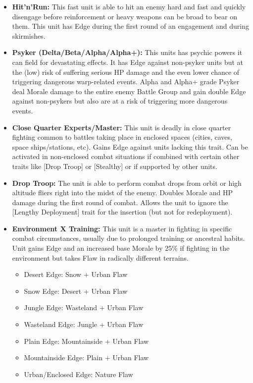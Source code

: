 \begin{itemize}
	\item \textbf{Hit'n'Run:} This fast unit is able to hit an enemy hard and fast and quickly disengage before reinforcement or heavy weapons can be broad to bear on them. This unit has Edge during the first round of an engagement and during skirmishes.
 	\item \textbf{Psyker (Delta/Beta/Alpha/Alpha+):} This units has psychic powers it can field for devastating effects. It has Edge against non-psyker units but at the (low) risk of suffering serious HP damage and the even lower chance of triggering dangerous warp-related events. Alpha and Alpha+ grade Psyker deal Morale damage to the entire enemy Battle Group and gain double Edge against non-psykers but also are at a risk of triggering more dangerous events.
 	\item \textbf{Close Quarter Experts/Master:} This unit is deadly in close quarter fighting common to battles taking place in enclosed spaces (cities, caves, space ships/stations, etc). Gains Edge against units lacking this trait. Can be activated in non-enclosed combat situations if combined with certain other traits like [Drop Troop] or [Stealthy] or if supported by other units.
 	\item \textbf{Drop Troop:} The unit is able to perform combat drops from orbit or high altitude fliers right into the midst of the enemy. Doubles Morale and HP damage during the first round of combat. Allows the unit to ignore the [Lengthy Deployment] trait for the insertion (but not for redeployment).
 	\item \textbf{Environment X Training:} This unit is a master in fighting in specific combat circumstances, usually due to prolonged training or ancestral habits. Unit gains Edge and an increased base Morale by 25\% if fighting in the environment but takes Flaw in radically different terrains.
 	\begin{itemize}
 		\item Desert Edge: Snow + Urban Flaw
 		\item Snow Edge: Desert + Urban Flaw
 		\item Jungle Edge: Wasteland + Urban Flaw
 		\item Wasteland Edge: Jungle + Urban Flaw
 		\item Plain Edge: Mountainside + Urban Flaw
 		\item Mountainside Edge: Plain + Urban Flaw
 		\item Urban/Enclosed Edge: Nature Flaw
 	\end{itemize}

\end{itemize}
